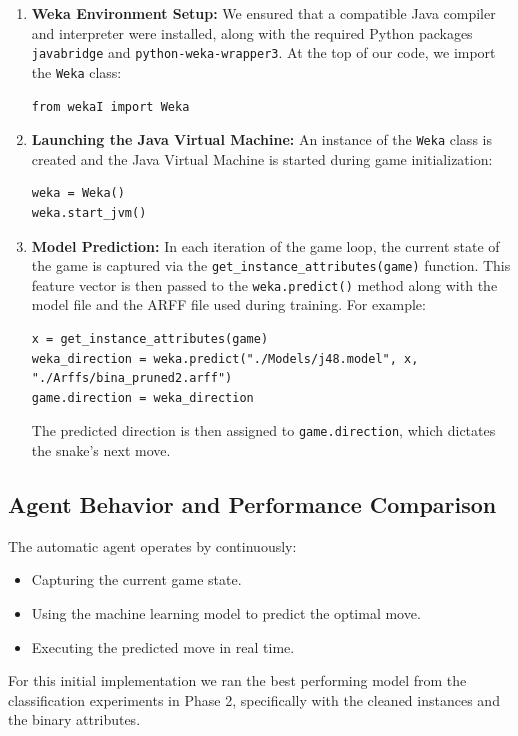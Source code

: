 \documentclass[12pt,a4paper]{article}
\begin{document}
\begin{enumerate}
    \item \textbf{Weka Environment Setup:}
    We ensured that a compatible Java compiler and interpreter were installed, along with the required Python packages \texttt{javabridge} and \texttt{python-weka-wrapper3}. At the top of our code, we import the \texttt{Weka} class:
    \begin{verbatim}
from wekaI import Weka
    \end{verbatim}

    \item \textbf{Launching the Java Virtual Machine:}
    An instance of the \texttt{Weka} class is created and the Java Virtual Machine is started during game initialization:
    \begin{verbatim}
weka = Weka()
weka.start_jvm()
    \end{verbatim}

    \item \textbf{Model Prediction:}
    In each iteration of the game loop, the current state of the game is captured via the \texttt{get\_instance\_attributes(game)} function. This feature vector is then passed to the \texttt{weka.predict()} method along with the model file and the ARFF file used during training. For example:
    \begin{verbatim}
x = get_instance_attributes(game)
weka_direction = weka.predict("./Models/j48.model", x, "./Arffs/bina_pruned2.arff")
game.direction = weka_direction
    \end{verbatim}
    The predicted direction is then assigned to \texttt{game.direction}, which dictates the snake's next move.
\end{enumerate}

\subsection{Agent Behavior and Performance Comparison}

The automatic agent operates by continuously:
\begin{itemize}
    \item Capturing the current game state.
    \item Using the machine learning model to predict the optimal move.
    \item Executing the predicted move in real time.
\end{itemize}

For this initial implementation we ran the best performing model from the classification experiments in Phase 2,
specifically with the cleaned instances and the binary attributes.
\end{document}
